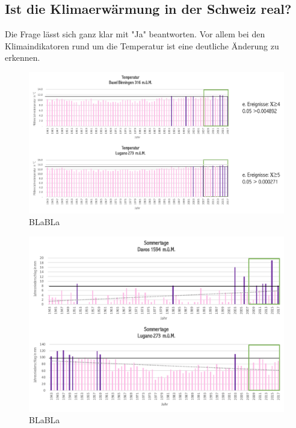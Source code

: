 \begin{refsection}
\section{Ist die Klimaerwärmung in der Schweiz real?}
Die Frage lässt sich ganz klar mit "Ja" beantworten. Vor allem bei den Klimaindikatoren rund um die Temperatur ist eine deutliche Änderung zu erkennen. 




\begin{figure}
\centering
\includegraphics[width=1.0\textwidth]{extrem/JMittel.pdf}
\caption{BLaBLa}
\label{JMittel}
\end{figure}

\begin{figure}
\centering
\includegraphics[width=1.0\textwidth]{extrem/Sommertage.pdf}
\caption{BLaBLa}
\label{Sommertage}
\end{figure}





\end{refsection}
